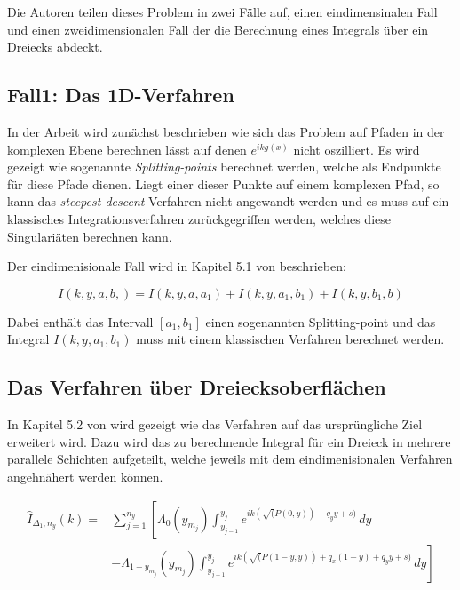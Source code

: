 Die Autoren teilen dieses Problem in zwei Fälle auf, einen eindimensinalen Fall und einen zweidimensionalen Fall der die Berechnung eines Integrals über ein Dreiecks abdeckt.


\subsection{Fall1: Das 1D-Verfahren}

In der Arbeit \cite{gasperini:hal-03209144} wird zunächst beschrieben wie sich das Problem auf Pfaden in der komplexen Ebene berechnen lässt auf denen $e^{ikg(x)}$ nicht oszilliert.
Es wird gezeigt wie sogenannte \textit{Splitting-points} berechnet werden, welche als Endpunkte für diese Pfade dienen.
Liegt einer dieser Punkte auf einem komplexen Pfad, so kann das \textit{steepest-descent}-Verfahren nicht angewandt werden und es muss auf ein klassisches Integrationsverfahren zurückgegriffen werden, welches diese Singulariäten berechnen kann.

Der eindimenisionale Fall wird in Kapitel 5.1 von \cite{gasperini:hal-03209144} beschrieben: 

\begin{equation}
    I(k,y,a,b,) = I(k,y,a,a_1) + I(k,y,a_1, b_1) + I(k,y,b_1,b)
\end{equation}

Dabei enthält das Intervall $[a_1,b_1]$ einen sogenannten Splitting-point und das Integral $I(k,y,a_1,b_1)$ muss mit einem klassischen Verfahren berechnet werden.


\subsection{Das Verfahren über Dreiecksoberflächen}

In Kapitel 5.2 von \cite*{gasperini:hal-03209144} wird gezeigt wie das Verfahren auf das ursprüngliche Ziel erweitert wird.
Dazu wird das zu berechnende Integral für ein Dreieck in mehrere parallele Schichten aufgeteilt, welche jeweils mit dem eindimenisionalen Verfahren angehnähert werden können.


\begin{equation}
    \begin{aligned}
        \hat{I}_{\Delta_1,n_y}(k) = & \sum_{j = 1}^{n_y} \left[ \Lambda_0(y_{m_j}) \int_{y_{j-1}}^{y_j}  e^{ik(\sqrt(P(0,y))+q_yy+s)}\,dy \right.\\
        & \left.  - \Lambda_{1-y_{m_j}}(y_{m_j}) \int_{y_{j-1}}^{y_j}  e^{ik(\sqrt(P(1-y,y))+q_x(1-y)+q_yy+s)}\,dy  \right] \\
    \end{aligned}
\end{equation}

